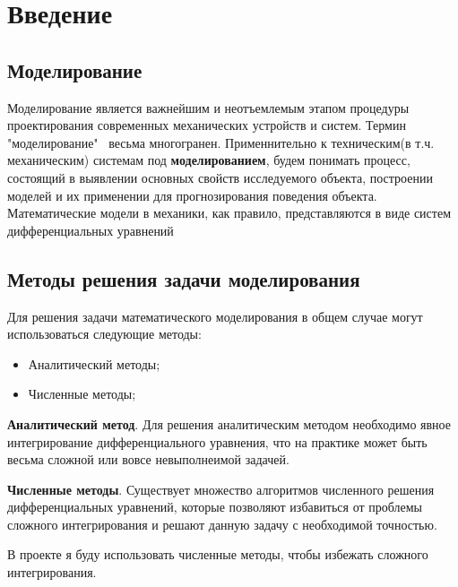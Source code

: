 \section{Введение}
\subsection{Моделирование}
    Моделирование является важнейшим и неотъемлемым этапом процедуры проектирования современных механических устройств и систем.
    Термин "моделирование"~ весьма многогранен. Применнительно к техническим(в т.ч. механическим) системам под \textbf{моделированием}, будем понимать процесс, состоящий в выявлении основных свойств исследуемого объекта, построении моделей и их применении для прогнозирования поведения объекта. Математические модели в механики, как правило, представляются в виде систем дифференциальных уравнений

\subsection{Методы решения задачи моделирования}
	Для решения задачи математического моделирования в общем случае могут использоваться следующие методы:
	\begin{itemize}
		\item Аналитический методы;
		\item Численные методы;
	\end{itemize}

	\textbf{Аналитический метод}. Для решения аналитическим методом необходимо явное интегрирование дифференциального уравнения, что на практике может быть весьма сложной или вовсе невыполнеимой задачей.
	
	\textbf{Численные методы}. Существует множество алгоритмов численного решения дифференциальных уравнений, которые позволяют избавиться от проблемы сложного интегрирования и решают данную задачу с необходимой точностью.
	
	В проекте я буду использовать численные методы, чтобы избежать сложного интегрирования.